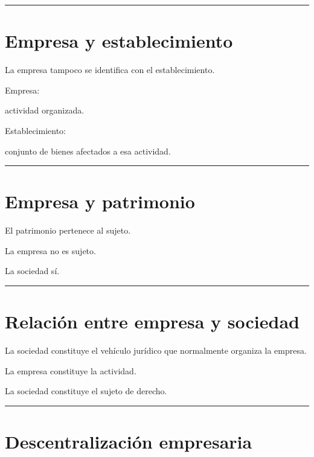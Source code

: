 \documentclass[
  spanish,
  letterpaper,
  DIV=11,
  numbers=noendperiod]{scrartcl}
\begin{document}
\begin{center}\rule{0.5\linewidth}{0.5pt}\end{center}

\section{Empresa y establecimiento}\label{empresa-y-establecimiento}

La empresa tampoco se identifica con el establecimiento.

Empresa:

actividad organizada.

Establecimiento:

conjunto de bienes afectados a esa actividad.

\begin{center}\rule{0.5\linewidth}{0.5pt}\end{center}

\section{Empresa y patrimonio}\label{empresa-y-patrimonio}

El patrimonio pertenece al sujeto.

La empresa no es sujeto.

La sociedad sí.

\begin{center}\rule{0.5\linewidth}{0.5pt}\end{center}

\section{Relación entre empresa y
sociedad}\label{relaciuxf3n-entre-empresa-y-sociedad}

La sociedad constituye el vehículo jurídico que normalmente organiza la
empresa.

La empresa constituye la actividad.

La sociedad constituye el sujeto de derecho.

\begin{center}\rule{0.5\linewidth}{0.5pt}\end{center}

\section{Descentralización
empresaria}\label{descentralizaciuxf3n-empresaria}
\end{document}

